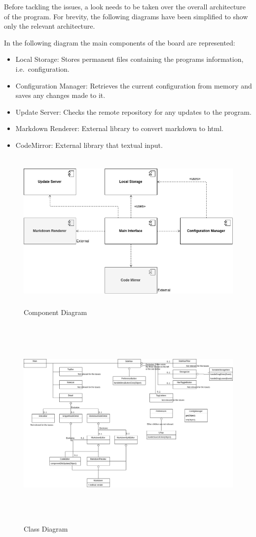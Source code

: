 Before tackling the issues, a look needs to be taken over the overall
architecture of the program. For brevity, the following diagrams have
been simplified to show only the relevant architecture.

In the following diagram the main components of the board are
represented:

\begin{itemize}
\item
  Local Storage: Stores permanent files containing the programs
  information, i.e.~configuration.
\item
  Configuration Manager: Retrieves the current configuration from memory
  and saves any changes made to it.
\item
  Update Server: Checks the remote repository for any updates to the
  program.
\item
  Markdown Renderer: External library to convert markdown to html.
\item
  CodeMirror: External library that textual input.
\end{itemize}

\begin{figure}
\centering
\includegraphics[height=3.12500in]{../componentDiagram.png}
\caption{Component Diagram}
\end{figure}

\begin{figure}
\centering
\includegraphics[height=4.16667in]{../classDiagram.png}
\caption{Class Diagram}
\end{figure}

